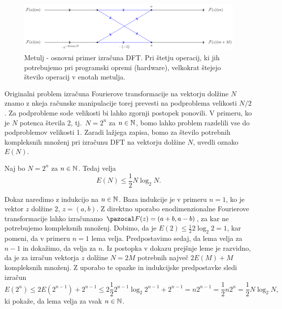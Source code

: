 %
\begin{figure}[htbp] \label{fig:metulj}
  \centering
  \includegraphics[width=1\textwidth]{./slike-latex/metulj}
\caption{Metulj - osnovni primer izračuna DFT. Pri štetju operacij, ki jih potrebujemo pri programski opremi (hardware), velkokrat štejejo število operacij v enotah metulja.}
\end{figure}
%

Originalni problem izračuna Fourierove transformacije na vektorju dolžine $N$ znamo z nkeja računske manipulacije torej prevesti na podproblema velikosti $N/2$. Za podprobleme sode velikosti bi lahko zgornji postopek ponovili. V primeru, ko je $N$ potenca števila 2, tj.\ $N = 2^n$ za $n \in \mathbb N$, bomo lahko problem razdelili vse do podproblemov velikosti 1. Zaradi lažjega zapisa, bomo za število potrebnih kompleksnih množenj pri izračunu DFT na vektorju dolžine $N$, uvedli oznako $E(N)$.
%
\begin{lema}
Naj bo $N = 2^n$ za $n \in \mathbb N$. Tedaj velja
\begin{equation*}
  E(N) \leq \frac{1}{2} N \log_2N.
\end{equation*}
\end{lema}
%
\begin{dokaz}
Dokaz naredimo z indukcijo na $n \in \mathbb N$. Baza indukcije je v primeru $n = 1$, ko je vektor $z$ dolžine 2, $z = (a, b)$. Z direktno uporabo enodimenzionalne Fourierove transformacije lahko izračunamo $\F(z) = (a + b, a - b)$, za kar ne potrebujemo kompleksnih množenj. Dobimo, da je $E(2) \leq \frac{1}{2} 2 \log_2 2 = 1$, kar pomeni, da v primeru $n = 1$ lema velja. Predpostavimo sedaj, da lema velja za $n - 1$ in dokažimo, da velja za $n$. Iz postopka v dokazu prejšnje leme je razvidno, da je za izračun vektorja $z$ dolžine $N = 2M$ potrebnih največ $2E(M) + M$ kompleksnih množenj. Z uporabo te opazke in indukcijske predpostavke sledi izračun
\begin{equation*}
  E(2^n) \leq 2 E(2^{n-1}) + 2^{n-1} \leq 2\frac{1}{2} 2^{n-1} \log_{2} 2^{n-1} + 2^{n-1} = n 2^{n-1} = \frac{1}{2} n 2^n = \frac{1}{2} N \log_2N,
\end{equation*}
ki pokaže, da lema velja za vsak $n \in \mathbb N$.
\end{dokaz}
